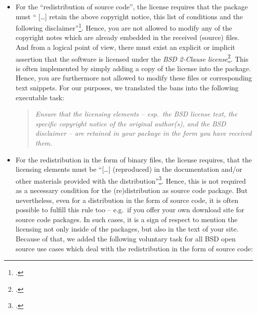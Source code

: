 \begin{itemize}
\item For the \enquote{redistribution of source code}, the license requires
that the package must \enquote{ [\ldots] retain the above copyright notice, this
list of conditions and the following disclaimer}\footcite[cf.][\nopage
wp]{BsdLicense2Clause}. Hence, you are not allowed to modify any of the
copyright notes which are already embedded in the received (source) files. And
from a logical point of view, there must exist an explicit or implicit
assertion that the software is licensed under the \textit{BSD 2-Clause
license}\footcite[The BSD license requires that a re-distributed software
package must contain the (package specific) copyright notice, the (license
specific) conditions and the BSD disclaimer. (cf.][\nopage wp) You might ask
what you should do, if these elements are missing in the package you received. If so,
the package you received had not been licensed adequately. Hence, you do not know
reliably whether you have received it under a BSD license. In other words: If
you have received a BSD licensed software package, it must contain sufficient
license fulfilling elements, or it is not a BSD licensed
software]{BsdLicense2Clause}. This is often implemented by simply adding a copy
of the license into the package. Hence, you are furthermore not allowed to
modify these files or corresponding text snippets. For our purposes, we
translated the bans into the following executable task:

\begin{quote}\textit{Ensure that the licensing elements -- esp.\ the BSD license
text, the specific copyright notice of the original author(s), and the BSD
disclaimer -- are retained in your package in the form you have received
them.}\end{quote}

\item For the redistribution in the form of binary files, the license requires, that
the licensing elements must be \enquote{[\ldots] (reproduced) in the
documentation and/or other materials provided with the
distribution}\footcite[cf.][\nopage wp]{BsdLicense2Clause}. Hence, this is not
required as a necessary condition for the (re)distribution as source code
package. But nevertheless, even for a distribution in the form of source code, it is
often possible to fulfill this rule too -- e.g.\ if you offer your own download
site for source code packages. In such cases, it is a sign of respect to
mention the licensing not only inside of the packages, but also in the text of
your site. Because of that, we added the following voluntary task for all BSD
open source use cases which deal with the redistribution in the form of source code:


\end{itemize}
